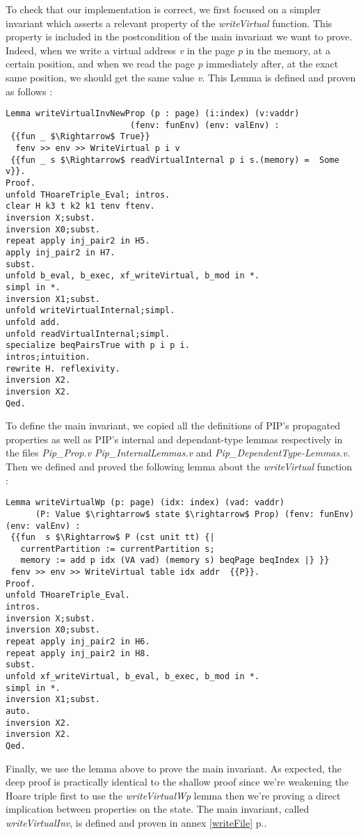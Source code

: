 To check that our implementation is correct, we first focused on a simpler invariant which asserts a relevant property of the \textit{writeVirtual} function. This property is included in the postcondition of the main invariant we want to prove. Indeed, when we write a virtual address \textit{v} in the page \textit{p} in the memory, at a certain position, and when we read the page \textit{p} immediately after, at the exact same position, we should get the same value \textit{v}. This Lemma is defined and proven as follows :
\begin{lstlisting}[caption = {writeVirtualInvNewProp invariant definition}, xleftmargin=-.05\textwidth,
xrightmargin=-.05\textwidth,mathescape=true, label={writeNew}]
Lemma writeVirtualInvNewProp (p : page) (i:index) (v:vaddr) 
	                     (fenv: funEnv) (env: valEnv) :
 {{fun _ $\Rightarrow$ True}}
  fenv >> env >> WriteVirtual p i v
 {{fun _ s $\Rightarrow$ readVirtualInternal p i s.(memory) =  Some v}}.
Proof.
unfold THoareTriple_Eval; intros.
clear H k3 t k2 k1 tenv ftenv.
inversion X;subst.
inversion X0;subst.
repeat apply inj_pair2 in H5.
apply inj_pair2 in H7.
subst.
unfold b_eval, b_exec, xf_writeVirtual, b_mod in *.
simpl in *.
inversion X1;subst.
unfold writeVirtualInternal;simpl.
unfold add.
unfold readVirtualInternal;simpl.
specialize beqPairsTrue with p i p i.
intros;intuition.
rewrite H. reflexivity.
inversion X2.
inversion X2.
Qed.    
\end{lstlisting} \vspace{4pt}

To define the main invariant, we copied all the definitions of PIP's propagated properties as well as PIP's internal and dependant-type lemmas respectively in the files \textit{Pip\_Prop.v} \textit{Pip\_InternalLemmas.v} and \textit{Pip\_DependentType-\linebreak Lemmas.v}. Then we defined and proved the following lemma about the  \textit{writeVirtual} function :
\begin{lstlisting}[caption = {writeVirtualWp lemma definition and proof}, xleftmargin=-.09\textwidth,
xrightmargin=-.09\textwidth,mathescape=true]
Lemma writeVirtualWp (p: page) (idx: index) (vad: vaddr) 
      (P: Value $\rightarrow$ state $\rightarrow$ Prop) (fenv: funEnv) (env: valEnv) :
 {{fun  s $\Rightarrow$ P (cst unit tt) {| 
   currentPartition := currentPartition s;
   memory := add p idx (VA vad) (memory s) beqPage beqIndex |} }} 
 fenv >> env >> WriteVirtual table idx addr  {{P}}.
Proof.
unfold THoareTriple_Eval.
intros. 
inversion X;subst.
inversion X0;subst.
repeat apply inj_pair2 in H6.
repeat apply inj_pair2 in H8.
subst.
unfold xf_writeVirtual, b_eval, b_exec, b_mod in *.
simpl in *.
inversion X1;subst.
auto.
inversion X2.
inversion X2.
Qed.
\end{lstlisting} \vspace{4pt}
Finally, we use the lemma above to prove the main invariant. As expected, the deep proof is practically identical to the shallow proof since we're weakening the Hoare triple first to use the 
\textit{writeVirtualWp} lemma then we're proving a direct implication between properties on the state. The main invariant, called \textit{writeVirtualInv}, is defined and proven in annex \ref{writeFile} p.\pageref{writeFile}. 

